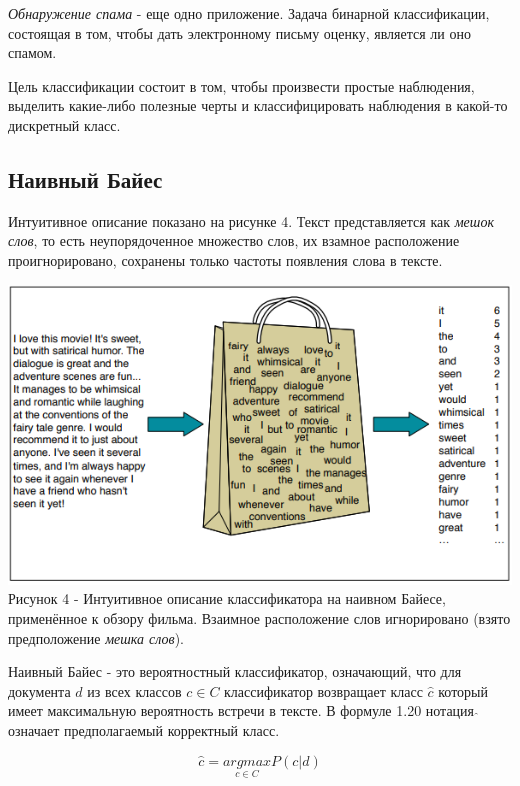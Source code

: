 \documentclass[a4paper,12pt,preview]{report} %
\begin{document}
	 \textit{Обнаружение спама} - еще одно приложение. Задача бинарной классификации, состоящая в том, чтобы дать электронному письму оценку, является ли оно спамом.
	 
	 Цель классификации состоит в том, чтобы произвести простые наблюдения, выделить какие-либо полезные черты и классифицировать наблюдения в какой-то дискретный класс.
	 
	 \subsection{Наивный Байес}
	 
	 Интуитивное описание показано на рисунке 4. Текст представляется как \textit{мешок слов}, то есть неупорядоченное множество слов, их взамное расположение проигнорировано, сохранены только частоты появления слова в тексте.
	 
	 
	 \begin{center}
	 	\includegraphics[scale=0.9]{NaiveBayes.PNG}
	 	\\ Рисунок 4 - Интуитивное описание классификатора на наивном Байесе, применённое к обзору фильма. Взаимное расположение слов игнорировано (взято предположение \textit{мешка слов}).
	 \end{center}
	  
	  Наивный Байес - это вероятностный классификатор, означающий, что для документа $d$ из всех классов $c \in C$ классификатор возвращает класс $\hat{c}$ который имеет максимальную вероятность встречи в тексте. В формуле 1.20 нотация $\hat{}$ означает предполагаемый корректный класс. 
	
	\begin{equation}
		\hat{c} = \underset{c \in C}{argmax} P(c | d)
	\end{equation}
	
\end{document}
